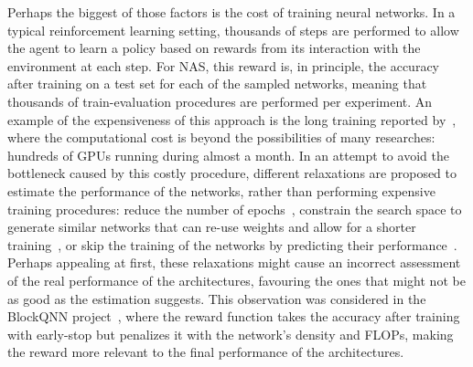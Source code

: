 Perhaps the biggest of those factors is the cost of training neural networks. In a typical reinforcement learning setting, thousands of steps are performed to allow the agent to learn a policy based on rewards from its interaction with the environment at each step. For NAS, this reward is, in principle, the accuracy after training on a test set for each of the sampled networks, meaning that thousands of train-evaluation procedures are performed per experiment. An example of the expensiveness of this approach is the long training reported by~\citet{ZophNAS1}, where the computational cost is beyond the possibilities of many researches: hundreds of GPUs running during almost a month. In an attempt to avoid the bottleneck caused by this costly procedure, different relaxations are proposed to estimate the performance of the networks, rather than performing expensive training procedures: reduce the number of epochs~\citep{BakerNAS,BlockQNNprev}, constrain the search space to generate similar networks that can re-use weights and allow for a shorter training~\citep{PathNAS}, or skip the training of the networks by predicting their performance~\citep{BlockQNN}. Perhaps appealing at first, these relaxations might cause an incorrect assessment of the real performance of the architectures, favouring the ones that might not be as good as the estimation suggests. This observation was considered in the BlockQNN project~\citep{BlockQNN}, where the reward function takes the accuracy after training with early-stop but penalizes it with the network's density and FLOPs, making the reward more relevant to the final performance of the architectures.


